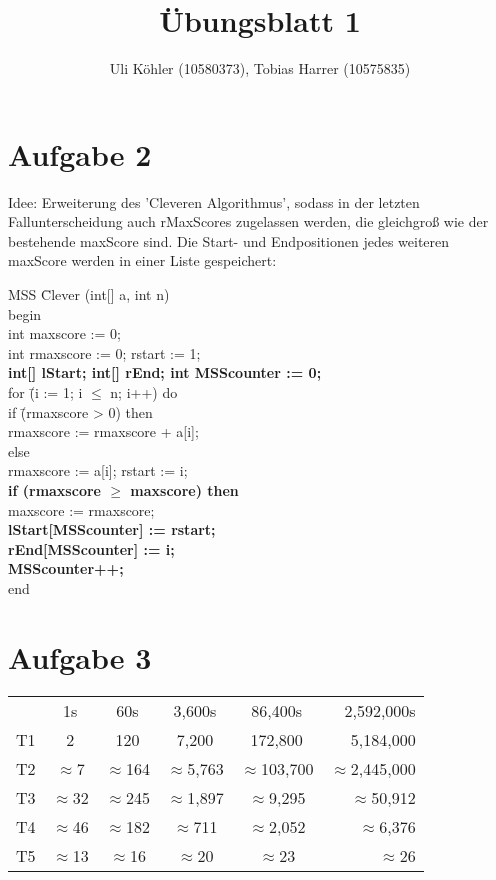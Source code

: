 \documentclass[a4paper,10pt]{article}
\title{Übungsblatt 1}
\author{Uli Köhler (10580373), Tobias Harrer (10575835)}
\begin{document}
\maketitle

\section{Aufgabe 2}
Idee: Erweiterung des 'Cleveren Algorithmus', sodass in der letzten Fallunterscheidung auch rMaxScores zugelassen werden,
die gleichgroß wie der bestehende maxScore sind. Die Start- und Endpositionen jedes weiteren maxScore werden in einer Liste gespeichert:
\newline
\begin{tabbing}
MSS \= Clever (int[] a, int n)\\
begin\\
\>int maxscore   := 0;\\
\>int rmaxscore  := 0; rstart := 1;\\
\>\textbf{int[] lStart; int[] rEnd; int MSScounter := 0;}\\
\>for \= (i := 1; i $\leq$ n; i++) do\\
\> \>if \=(rmaxscore > 0) then\\
\> \> \>rmaxscore := rmaxscore + a[i];\\
\> \> else \= \\
\> \> \>rmaxscore := a[i]; rstart := i;\\
\> \>\textbf{if (rmaxscore $\geq$ maxscore) then}\\
\> \> \> maxscore := rmaxscore; \\ \> \> \> \textbf{lStart[MSScounter] := rstart;}\\ \> \> \> \textbf{rEnd[MSScounter] := i;}\\
\> \> \>  \textbf{MSScounter++;}\\
end 
\end{tabbing}

\section{Aufgabe 3}
 \begin{tabular}{lccccr}
   & 1s & 60s & 3,600s & 86,400s & 2,592,000s \\
  T1 & 2 &120 &	7,200 &	172,800 &5,184,000 \\
  T2&$\approx$7&$\approx$164&$\approx$5,763&$\approx$103,700 &$\approx$2,445,000\\
  T3&$\approx$32&$\approx$245&$\approx$1,897&$\approx$9,295&$\approx$50,912\\
  T4&$\approx$46&$\approx$182&$\approx$711&$\approx$2,052&$\approx$6,376\\
  T5&$\approx$13&$\approx$16&$\approx$20&$\approx$23&$\approx$26\\
 \end{tabular}
\end{document}
